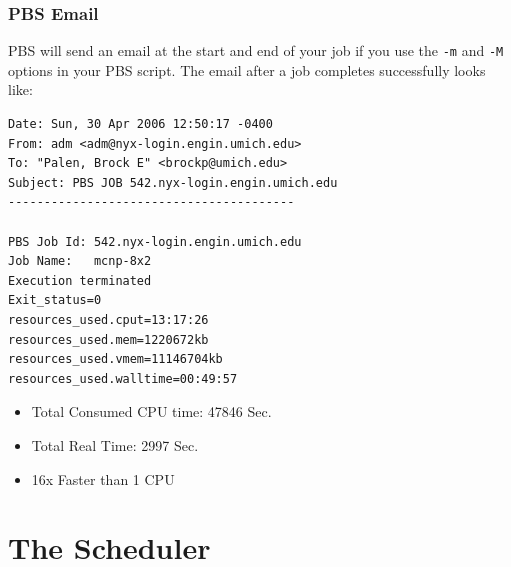 \documentclass{beamer}
\begin{document}
\begin{frame}[fragile]
 \frametitle{PBS Email}
PBS will send an email at the start and end of your job if you use the
\texttt{-m} and \texttt{-M} options in your PBS script.  The email after a job
completes successfully looks like:
\tiny
\begin{verbatim}
Date: Sun, 30 Apr 2006 12:50:17 -0400
From: adm <adm@nyx-login.engin.umich.edu>
To: "Palen, Brock E" <brockp@umich.edu>
Subject: PBS JOB 542.nyx-login.engin.umich.edu
----------------------------------------

PBS Job Id: 542.nyx-login.engin.umich.edu
Job Name:   mcnp-8x2
Execution terminated
Exit_status=0
resources_used.cput=13:17:26
resources_used.mem=1220672kb
resources_used.vmem=11146704kb
resources_used.walltime=00:49:57
\end{verbatim}
\normalsize
\begin{itemize}
  \item<2-> Total Consumed CPU time: 47846 Sec.
  \item<2-> Total Real Time: 2997 Sec.
  \item<3-> 16x Faster than 1 CPU 
\end{itemize}
\end{frame}
\section{The Scheduler}
\end{document}

